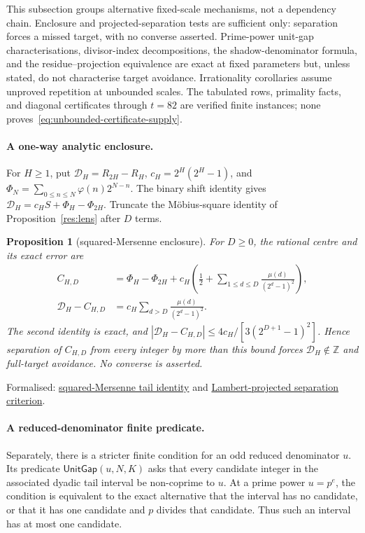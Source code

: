 \documentclass[11pt]{article}
\newcommand{\commit}{99f4bf47422abbd8757cbb22b50ba079d764d3a7}
\newcommand{\repobase}{https://github.com/wcook04/plectis-erdos/blob/\commit}
\newcommand{\PK}{Erdos249257}
\newcommand{\lword}[4]{\href{\repobase/\PK/#1\#L#2}{#4}}
\newtheorem{proposition}[theorem]{Proposition}
\theoremstyle{definition}
\theoremstyle{remark}
\newcommand{\Z}{\mathbb{Z}}
\newcommand{\ph}{\varphi}
\begin{document}
{This subsection groups alternative fixed-scale mechanisms, not a dependency
chain.  Enclosure and projected-separation tests are sufficient only:
separation forces a missed target, with no converse asserted.  Prime-power
unit-gap characterisations, divisor-index decompositions, the shadow-denominator
formula, and the residue--projection equivalence are exact at fixed parameters
but, unless stated, do not characterise target avoidance.  Irrationality
corollaries assume unproved repetition at unbounded scales.  The tabulated
rows, primality facts, and diagonal certificates through $t=82$ are verified
finite instances; none proves~\eqref{eq:unbounded-certificate-supply}.

\paragraph{A one-way analytic enclosure.}
For $H\ge1$, put $\mathcal D_H=R_{2H}-R_H$,
$c_H=2^H(2^H-1)$, and
$\Phi_N=\sum_{0\le n\le N}\ph(n)2^{N-n}$.  The binary shift identity gives
$\mathcal D_H=c_HS+\Phi_H-\Phi_{2H}$.  Truncate the M\"obius-square identity
of Proposition~\ref{res:lens} after $D$ terms.

\begin{proposition}[squared-Mersenne enclosure]\label{res:squareenclosure}
For $D\ge0$, the rational centre and its exact error are
\[
 \begin{aligned}
 C_{H,D}&=\Phi_H-\Phi_{2H}
   +c_H\left(\frac12+\sum_{1\le d\le D}
      \frac{\mu(d)}{(2^d-1)^2}\right),\\
 \mathcal D_H-C_{H,D}
   &=c_H\sum_{d>D}\frac{\mu(d)}{(2^d-1)^2}.
 \end{aligned}
\]
The second identity is exact, and
$|\mathcal D_H-C_{H,D}|\le4c_H/[3(2^{D+1}-1)^2]$.  Hence separation of
$C_{H,D}$ from every integer by more than this bound forces
$\mathcal D_H\notin\Z$ and full-target avoidance.  No converse is asserted.
\end{proposition}
\noindent Formalised:
\lword{SquaredMersenneDiagonalEnclosure.lean}{138}{scaleDiagonalTailDifference_sub_lambertProjectedDiagonal}{squared-Mersenne tail identity}
and
\lword{SquaredMersenneDiagonalEnclosure.lean}{426}{scaleFullTarget_miss_of_lambert_projected_separation}{Lambert-projected separation criterion}.

\paragraph{A reduced-denominator finite predicate.}  Separately, there is a
stricter finite condition for an odd reduced denominator
$u$.  Its predicate $\mathsf{UnitGap}(u,N,K)$ asks that
every candidate integer in the associated dyadic tail interval be non-coprime
to $u$.  At a prime power $u=p^e$, the condition is equivalent to the exact
alternative that the interval has no candidate, or that it has one candidate
and $p$ divides that candidate.  Thus such an interval has at most one
candidate.

}
\end{document}
